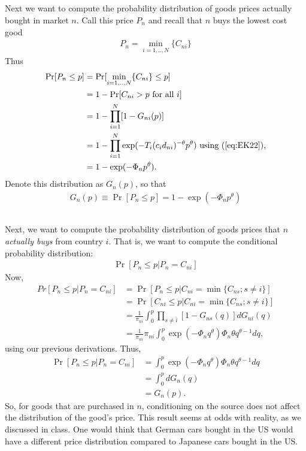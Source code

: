 \documentclass[12pt]{article}
\begin{document}
\subsection{} Next we want to compute the probability distribution of goods prices actually bought in market $n$. Call this price $P_n$ and recall that $n$ buys the lowest cost good
\begin{align*}
P_n = \min_{i=1,..,N}\{C_{ni}\}
\end{align*}
Thus
\begin{align*}
\Pr[P_n \leq p ] &= \Pr[ \min_{i=1,..,N}\{C_{ni}\} \leq p]\\
&= 1-\Pr[C_{ni} > p \text{ for all } i]\\
&= 1- \prod_{i=1}^N[1-G_{ni}(p)]\\
&= 1-  \prod_{i=1}^N \exp(-T_i(c_id_{ni})^{-\theta}p^\theta) \text{ using (\ref{eq:EK22}),}\\
&= 1- \exp(-\Phi_n p^\theta).
\end{align*}
Denote this distribution as $G_n(p)$, so that 
\begin{align}
G_n(p) \equiv \Pr[P_n \leq p ] = 1- \exp(-\Phi_n p^\theta) \label{eq:EK25}
\end{align}

\subsection{} Next, we want to compute the probability distribution of goods prices that $n$ \textit{actually buys} from country $i$. That is, we want to compute the conditional probability distribution:
\begin{align*}
\Pr[P_n \leq p | P_n = C_{ni}]
\end{align*}
Now,
\begin{align*}
Pr[P_n \leq p | P_n = C_{ni}]&=\Pr[P_n \leq p |C_{ni} = \min\{C_{ns}; s\neq i\}]\\
&=\Pr[C_{ni}  \leq p |C_{ni} = \min\{C_{ns}; s\neq i\}]\\
&=\frac{1}{\pi_{ni}} \int_0^p \prod_{s \neq i}  [1-G_{ns}(q)] dG_{ni}(q)\\
&=\frac{1}{\pi_{ni}} \pi_{ni}\int_0^p \exp(-\Phi_nq^\theta) \Phi_n\theta q^{\theta-1}dq,
\end{align*}
using our previous derivations. Thus,
\begin{align*}
\Pr[P_n \leq p | P_n = C_{ni}]&= \int_0^p \exp(-\Phi_nq^\theta) \Phi_n\theta q^{\theta-1}dq \\
&= \int_0^p dG_n(q)\\
&= G_n(p).
\end{align*}
So, for goods that are purchased in $n$, conditioning on the source does not affect the distribution of the good's price. This result seems at odds with reality, as we discussed in class. One would think that German cars bought in the US would have a different price distribution compared to Japanese cars bought in the US.
\end{document}
